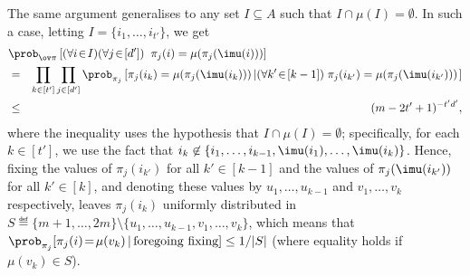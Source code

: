 %
%
%
%
The same argument generalises to any set $I\subseteq A$
such that $I\cap\mu(I)=\emptyset$.
In such a case, letting $I=\{i_1,\ldots,i_{t'}\}$, we get
\begin{eqnarray*}
\lefteqn{\prob_{\ov\pi}\left[(\forall i\!\in\!I)(\forall j\!\in\![d'])\;\;
                     \pi_j(i)=\mu(\pi_j(\imu(i)))\right]} \\
&=& \prod_{k\in[t']}\prod_{j\in[d']}
    \prob_{\pi_j}\left[\pi_j(i_k)=\mu(\pi_j(\imu(i_k)))
          \left|(\forall k'\!\in\![k-1])\;
                   \pi_j(i_{k'})=\mu(\pi_j(\imu(i_{k'})))\right.\right] \\
&\leq& (m-2t'+1)^{-t'd'},
\end{eqnarray*}
where the inequality uses the hypothesis that $I\cap\mu(I)=\emptyset$;
specifically, for each $k\in[t']$, we use the fact
that $i_k\not\in\{i_1,\ldots,i_{k-1},\imu(i_1),\ldots,\imu(i_{k})\}$.
%
Hence, fixing the values of $\pi_j(i_{k'})$ for all $k'\in[k-1]$
and the values of $\pi_j(\imu(i_{k'}))$ for all $k'\in[k]$,
and denoting these values
by $u_1,\ldots,u_{k-1}$ and $v_1,\ldots,v_{k}$ respectively,
leaves $\pi_j(i_k)$ uniformly distributed
in $S\eqdef\{m+1,\ldots,2m\}\setminus\{u_1,\ldots,u_{k-1},v_1,\ldots,v_k\}$,
which means that
$\prob_{\pi_j}[\pi_j(i)\!=\!\mu(v_k)\,|\,\mbox{\rm foregoing fixing}]\leq1/|S|$
(where equality holds if $\mu(v_k)\in S$).
%
%
%
%
%
%
%

